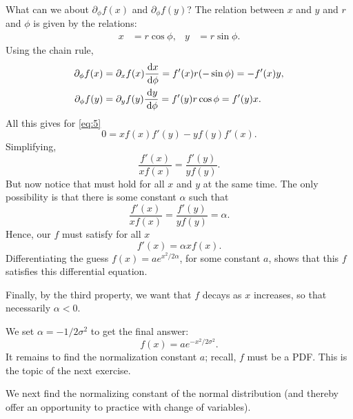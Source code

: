 \documentclass[lectures]{subfiles}
\begin{document}
\begin{exercise}
\begin{solution}
What can we about $\partial_{\phi} f(x)$ and $\partial_{\phi}f(y)$?
The relation between $x$ and $y$ and $r$ and $\phi$ is given by the relations:
\begin{align}
\label{eq:6}
x &= r \cos \phi, & y&=r\sin \phi.
\end{align}
Using the chain rule,
\begin{align}
  \label{eq:7}
  \partial_{\phi} f(x) &= \partial_{x} f(x) \frac{\,\textrm{d}x}{\,\textrm{d}\phi} = f'(x) r (-\sin \phi) = - f'(x) y, \\
  \partial_{\phi} f(y) &= \partial_{y} f(y) \frac{\,\textrm{d}y}{\,\textrm{d}\phi} = f'(y) r \cos \phi =  f'(y) x.
\end{align}
All this gives for \cref{eq:5}
\begin{equation}
\label{eq:8}
0 = x f(x) f'(y) - y f(y)f'(x).
\end{equation}
Simplifying,
\begin{equation}
  \label{eq:9}
   \frac{f'(x)}{x f(x)} = \frac{f'(y)}{ y f(y)}.
\end{equation}
But now notice that must hold for all $x$ and $y$ at the same time. The only possibility is that there is some constant $\alpha$ such that
\begin{equation}
\label{eq:10}
   \frac{f'(x)}{x f(x)} =  \frac{f'(y)}{y f(y)} = \alpha.
\end{equation}
Hence, our $f$ must satisfy for all $x$
\begin{equation}
\label{eq:11}
f'(x) = \alpha x f(x).
\end{equation}
Differentiating the guess $f(x) = a e^{ x^2/{2 \alpha}}$, for some constant $a$, shows that this $f$ satisfies this differential equation.

Finally, by the third property, we want that $f$ decays as $x$ increases, so that necessarily $\alpha<0$.


We set $\alpha = -1/2\sigma^{2}$ to get the final answer:
\begin{equation}
  \label{eq:12}
  f(x) = a e^{-x^{2}/2 \sigma^{2}}.
\end{equation}
It remains to find the normalization constant $a$; recall, $f$ must be a PDF. This is the topic of the next exercise.
\end{solution}
\end{exercise}

We next find the normalizing constant of the normal distribution (and thereby offer an opportunity to practice with change of variables).
\end{document}
